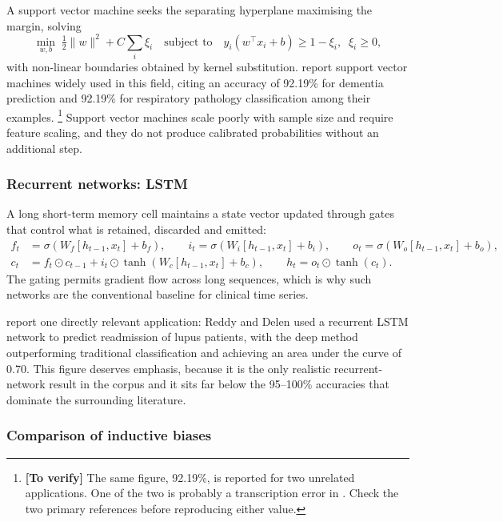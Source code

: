 \documentclass[12pt,a4paper,oneside]{report}
\newcommand{\verify}[1]{\footnote{\textbf{[To verify]} #1}}
\begin{document}
A support vector machine seeks the separating hyperplane maximising the margin, solving
\begin{equation}
  \min_{w,b} \; \tfrac{1}{2}\lVert w \rVert^2 + C\sum_i \xi_i
  \quad\text{subject to}\quad
  y_i(w^{\top} x_i + b) \geq 1 - \xi_i, \;\; \xi_i \geq 0,
\end{equation}
with non-linear boundaries obtained by kernel substitution. \Textcite{liu2025review} report support vector machines widely used in this field, citing an accuracy of 92.19\% for dementia prediction and 92.19\% for respiratory pathology classification among their examples.%
\verify{The same figure, 92.19\%, is reported for two unrelated applications. One of the two is probably a transcription error in \textcite{liu2025review}. Check the two primary references before reproducing either value.}
Support vector machines scale poorly with sample size and require feature scaling, and they do not produce calibrated probabilities without an additional step.

\subsubsection{Recurrent networks: LSTM}

A long short-term memory cell maintains a state vector updated through gates that control what is retained, discarded and emitted:
\begin{align}
  f_t &= \sigma(W_f[h_{t-1}, x_t] + b_f), \qquad
  i_t = \sigma(W_i[h_{t-1}, x_t] + b_i), \qquad
  o_t = \sigma(W_o[h_{t-1}, x_t] + b_o),\\
  c_t &= f_t \odot c_{t-1} + i_t \odot \tanh(W_c[h_{t-1}, x_t] + b_c),
  \qquad h_t = o_t \odot \tanh(c_t).
\end{align}
The gating permits gradient flow across long sequences, which is why such networks are the conventional baseline for clinical time series.

\Textcite{liu2025review} report one directly relevant application: Reddy and Delen used a recurrent LSTM network to predict readmission of lupus patients, with the deep method outperforming traditional classification and achieving an area under the curve of 0.70. This figure deserves emphasis, because it is the only realistic recurrent-network result in the corpus and it sits far below the 95--100\% accuracies that dominate the surrounding literature.

\subsubsection{Comparison of inductive biases}
\end{document}
